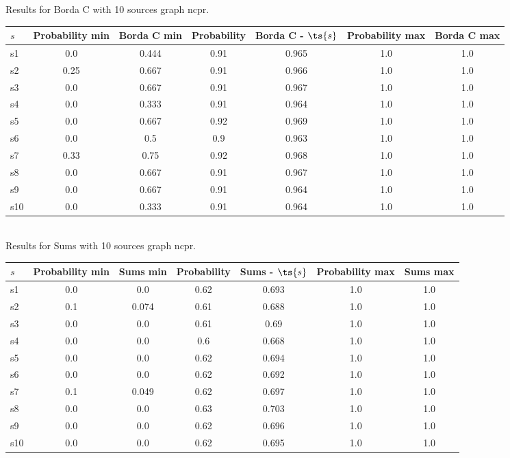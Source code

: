\documentclass{article}
\begin{document}
\noindent Results for Borda C with 10 sources graph ncpr.

\noindent\begin{tabular}{|l|c|c|c|c|c|c|}
\hline
$s$& Probability min & Borda C min & Probability & Borda C - $\ts{s}$ & Probability max & Borda C max\\
\hline
s1 &0.0 & 0.444 & 0.91 & 0.965 & 1.0 & 1.0\\
\hline
s2 &0.25 & 0.667 & 0.91 & 0.966 & 1.0 & 1.0\\
\hline
s3 &0.0 & 0.667 & 0.91 & 0.967 & 1.0 & 1.0\\
\hline
s4 &0.0 & 0.333 & 0.91 & 0.964 & 1.0 & 1.0\\
\hline
s5 &0.0 & 0.667 & 0.92 & 0.969 & 1.0 & 1.0\\
\hline
s6 &0.0 & 0.5 & 0.9 & 0.963 & 1.0 & 1.0\\
\hline
s7 &0.33 & 0.75 & 0.92 & 0.968 & 1.0 & 1.0\\
\hline
s8 &0.0 & 0.667 & 0.91 & 0.967 & 1.0 & 1.0\\
\hline
s9 &0.0 & 0.667 & 0.91 & 0.964 & 1.0 & 1.0\\
\hline
s10 &0.0 & 0.333 & 0.91 & 0.964 & 1.0 & 1.0\\
\hline
\end{tabular}\\

\noindent Results for Sums with 10 sources graph ncpr.

\noindent\begin{tabular}{|l|c|c|c|c|c|c|}
\hline
$s$& Probability min & Sums min & Probability & Sums - $\ts{s}$ & Probability max & Sums max\\
\hline
s1 &0.0 & 0.0 & 0.62 & 0.693 & 1.0 & 1.0\\
\hline
s2 &0.1 & 0.074 & 0.61 & 0.688 & 1.0 & 1.0\\
\hline
s3 &0.0 & 0.0 & 0.61 & 0.69 & 1.0 & 1.0\\
\hline
s4 &0.0 & 0.0 & 0.6 & 0.668 & 1.0 & 1.0\\
\hline
s5 &0.0 & 0.0 & 0.62 & 0.694 & 1.0 & 1.0\\
\hline
s6 &0.0 & 0.0 & 0.62 & 0.692 & 1.0 & 1.0\\
\hline
s7 &0.1 & 0.049 & 0.62 & 0.697 & 1.0 & 1.0\\
\hline
s8 &0.0 & 0.0 & 0.63 & 0.703 & 1.0 & 1.0\\
\hline
s9 &0.0 & 0.0 & 0.62 & 0.696 & 1.0 & 1.0\\
\hline
s10 &0.0 & 0.0 & 0.62 & 0.695 & 1.0 & 1.0\\
\hline
\end{tabular}\\
\end{document}
